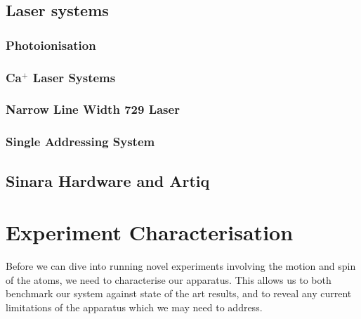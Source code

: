 \documentclass[12pt]{report}
\begin{document}
\section{Laser systems}
\label{sec:Laser systems}
\subsection{Photoionisation}
\subsection{Ca$^+$ Laser Systems}	
\label{sec:Ca+ Laser Systems}


\subsection{Narrow Line Width 729 Laser}
\label{sec:Narrow Line Width 729 Laser} 

\subsection{Single Addressing System}
\label{sec:Single Addressing System}

\section{Sinara Hardware and Artiq}
\label{sec:Sinara Hardware}



\chapter{Experiment Characterisation}

    Before we can dive into running novel experiments involving the motion and spin
    of the atoms, we need to characterise our apparatus. This allows us to both
    benchmark our system against state of the art results, and to reveal any
    current limitations of the apparatus which we may need to address.
\end{document}
